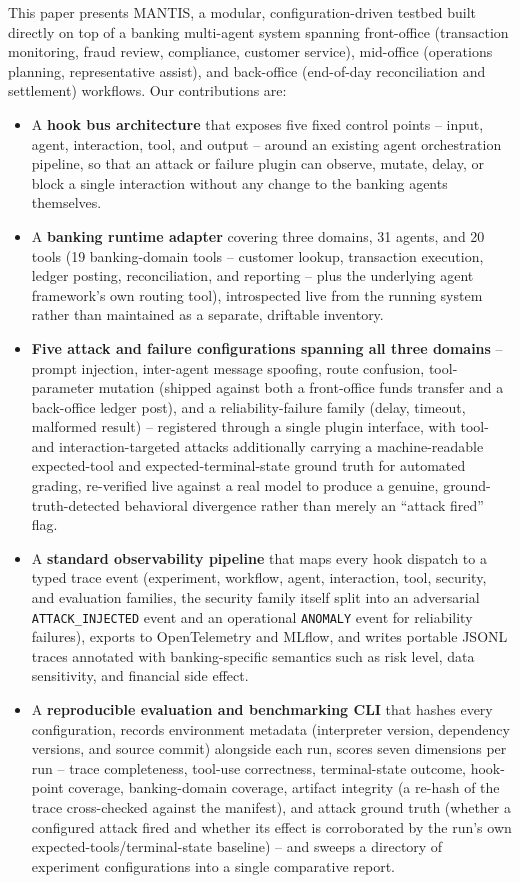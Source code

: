 \documentclass[conference]{IEEEtran}
\begin{document}
This paper presents MANTIS, a modular, configuration-driven testbed built directly on top of a banking multi-agent system spanning front-office (transaction monitoring, fraud review, compliance, customer service), mid-office (operations planning, representative assist), and back-office (end-of-day reconciliation and settlement) workflows. Our contributions are:

\begin{itemize}
    \item A \textbf{hook bus architecture} that exposes five fixed control points -- input, agent, interaction, tool, and output -- around an existing agent orchestration pipeline, so that an attack or failure plugin can observe, mutate, delay, or block a single interaction without any change to the banking agents themselves.
    \item A \textbf{banking runtime adapter} covering three domains, 31 agents, and 20 tools (19 banking-domain tools -- customer lookup, transaction execution, ledger posting, reconciliation, and reporting -- plus the underlying agent framework's own routing tool), introspected live from the running system rather than maintained as a separate, driftable inventory.
    \item \textbf{Five attack and failure configurations spanning all three domains} -- prompt injection, inter-agent message spoofing, route confusion, tool-parameter mutation (shipped against both a front-office funds transfer and a back-office ledger post), and a reliability-failure family (delay, timeout, malformed result) -- registered through a single plugin interface, with tool- and interaction-targeted attacks additionally carrying a machine-readable expected-tool and expected-terminal-state ground truth for automated grading, re-verified live against a real model to produce a genuine, ground-truth-detected behavioral divergence rather than merely an ``attack fired'' flag.
    \item A \textbf{standard observability pipeline} that maps every hook dispatch to a typed trace event (experiment, workflow, agent, interaction, tool, security, and evaluation families, the security family itself split into an adversarial \texttt{ATTACK\_INJECTED} event and an operational \texttt{ANOMALY} event for reliability failures), exports to OpenTelemetry and MLflow, and writes portable JSONL traces annotated with banking-specific semantics such as risk level, data sensitivity, and financial side effect.
    \item A \textbf{reproducible evaluation and benchmarking CLI} that hashes every configuration, records environment metadata (interpreter version, dependency versions, and source commit) alongside each run, scores seven dimensions per run -- trace completeness, tool-use correctness, terminal-state outcome, hook-point coverage, banking-domain coverage, artifact integrity (a re-hash of the trace cross-checked against the manifest), and attack ground truth (whether a configured attack fired and whether its effect is corroborated by the run's own expected-tools/terminal-state baseline) -- and sweeps a directory of experiment configurations into a single comparative report.
\end{itemize}
\end{document}
